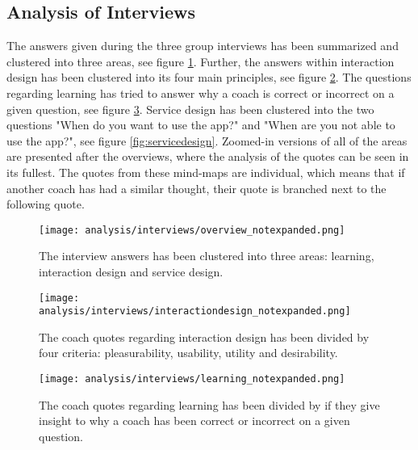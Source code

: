 \subsection{Analysis of Interviews}

The answers given during the three group interviews has been summarized and clustered into three areas, see figure \ref{fig:overview}. Further, the answers within interaction design has been clustered into its four main principles, see figure \ref{fig:interactiondesign}. The questions regarding learning has tried to answer why a coach is correct or incorrect on a given question, see figure \ref{fig:learning}. Service design has been clustered into the two questions "When do you want to use the app?" and "When are you not able to use the app?", see figure \ref{fig:servicedesign}. Zoomed-in versions of all of the areas are presented after the overviews, where the analysis of the quotes can be seen in its fullest. The quotes from these mind-maps are individual, which means that if another coach has had a similar thought, their quote is branched next to the following quote.

\begin{figure}[h]
    \centering
    \texttt{[image: analysis/interviews/overview\_notexpanded.png]}
    \caption{The interview answers has been clustered into three areas: learning, interaction design and service design.}
    \label{fig:overview}
\end{figure}

\begin{figure}[h]
    \centering
    \texttt{[image: analysis/interviews/interactiondesign\_notexpanded.png]}
    \caption{The coach quotes regarding interaction design has been divided by four criteria: pleasurability, usability, utility and desirability.}
    \label{fig:interactiondesign}
\end{figure}


\begin{figure}[h]
    \centering
    \texttt{[image: analysis/interviews/learning\_notexpanded.png]}
    \caption{The coach quotes regarding learning has been divided by if they give insight to why a coach has been correct or incorrect on a given question.}
    \label{fig:learning}
\end{figure}

